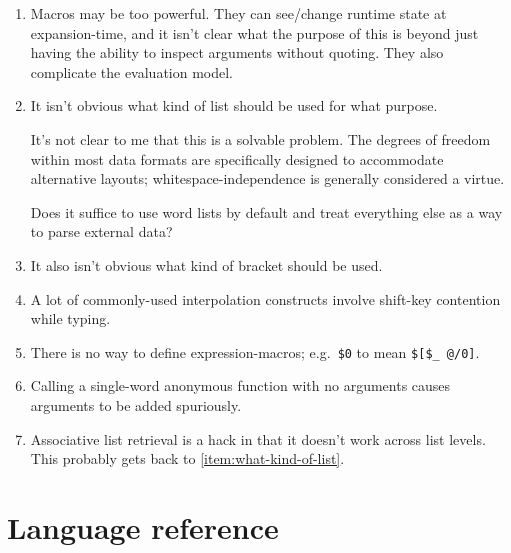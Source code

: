 \documentclass{report}
\begin{document}
\begin{enumerate}
\item{}
  \label{item:macros-too-powerful}
  Macros may be too powerful. They can see/change runtime state at
  expansion-time, and it isn't clear what the purpose of this is beyond
  just having the ability to inspect arguments without quoting. They also
  complicate the evaluation model.

\item{}
  \label{item:what-kind-of-list}
  It isn't obvious what kind of list should be used for what purpose.

  It's not clear to me that this is a solvable problem. The degrees of
  freedom within most data formats are specifically designed to
  accommodate alternative layouts; whitespace-independence is generally
  considered a virtue.

  Does it suffice to use word lists by default and treat everything else
  as a way to parse external data?

\item{}
  \label{item:what-kind-of-bracket}
  It also isn't obvious what kind of bracket should be used.

\item{}
  \label{item:hard-to-type}
  A lot of commonly-used interpolation constructs involve shift-key
  contention while typing.

\item{}
  \label{item:no-expression-macros}
  There is no way to define expression-macros; e.g.~\verb|$0| to mean
  \verb|$[$_ @/0]|.

\item{}
  \label{item:ambiguous-eta-expansion}
  Calling a single-word anonymous function with no arguments causes
  arguments to be added spuriously.

\item{}
  \label{item:associative-retrieval}
  Associative list retrieval is a hack in that it doesn't work across
  list levels. This probably gets back to \ref{item:what-kind-of-list}.
\end{enumerate}

\part{Language reference}\label{part:language-reference}
\end{document}
